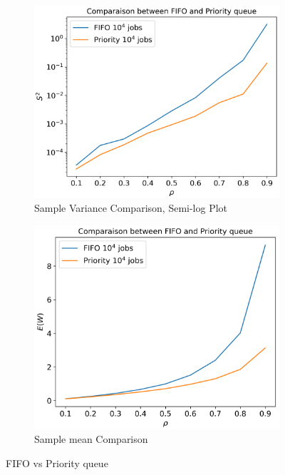 \documentclass{article}
\begin{document}
    \begin{figure}[h]
        \begin{subfigure}[b]{0.48\textwidth}
            \includegraphics[width=\textwidth]{pictures/part_3/sample_variance_fifo_priority.png}
            \caption{Sample Variance Comparison, Semi-log Plot}
            \label{fig:q3_samp_var}
        \end{subfigure}
        \begin{subfigure}[b]{0.45\textwidth}
            \includegraphics[width=\textwidth]{pictures/part_3/sample_mean_fifo_priority.png}
            \caption{Sample mean Comparison}
            \label{fig:q3_samp_mean}
        \end{subfigure}
        \caption{FIFO vs Priority queue}
        \label{fig:fifo_vs_priority_samp_mean_var}
    \end{figure}
\end{document}
